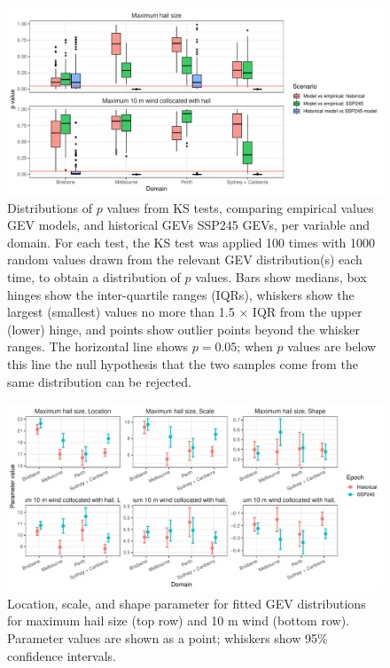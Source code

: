 \documentclass[]{agujournal2019}\usepackage[]{graphicx}\usepackage[]{xcolor}
\begin{document}
\begin{figure}[!ht]
      \includegraphics[width=\textwidth]{figures/fit_pvals}
      \caption{Distributions of $p$ values from KS tests, comparing empirical values GEV models, and historical GEVs SSP245 GEVs, per variable and domain. For each test, the KS test was applied 100 times with 1000 random values drawn from the relevant GEV distribution(s) each time, to obtain a distribution of $p$ values. Bars show medians, box hinges show the inter-quartile ranges (IQRs), whiskers show the largest (smallest) values no more than 1.5 $\times$ IQR from the upper (lower) hinge, and points show outlier points beyond the whisker ranges. The horizontal line shows $p = 0.05$; when $p$ values are below this line the null hypothesis that the two samples come from the same distribution can be rejected.}
      \label{fig:ks_pvals}
\end{figure}

\begin{figure}[!ht]
      \includegraphics[width=\textwidth]{figures/fit_params}
      \caption{Location, scale, and shape parameter for fitted GEV distributions for maximum hail size (top row) and 10 m wind (bottom row). Parameter values are shown as a point; whiskers show 95\% confidence intervals.}
      \label{fig:gev_parameters}
\end{figure}
\end{document}
